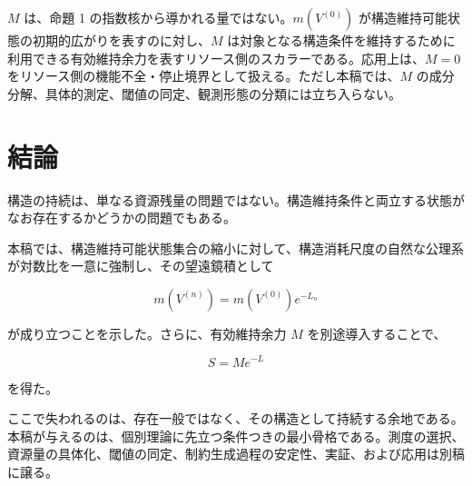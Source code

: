 \documentclass[12pt,a4paper]{article}
\begin{document}
\(M\) は、命題 1 の指数核から導かれる量ではない。\(m(V^{(0)})\) が構造維持可能状態の初期的広がりを表すのに対し、\(M\) は対象となる構造条件を維持するために利用できる有効維持余力を表すリソース側のスカラーである。応用上は、\(M=0\) をリソース側の機能不全・停止境界として扱える。ただし本稿では、\(M\) の成分分解、具体的測定、閾値の同定、観測形態の分類には立ち入らない。

\section{結論}\label{ux7d50ux8ad6}

構造の持続は、単なる資源残量の問題ではない。構造維持条件と両立する状態がなお存在するかどうかの問題でもある。

本稿では、構造維持可能状態集合の縮小に対して、構造消耗尺度の自然な公理系が対数比を一意に強制し、その望遠鏡積として

\[
m(V^{(n)}) = m(V^{(0)}) e^{-L_{n}}
\]

が成り立つことを示した。さらに、有効維持余力 \(M\) を別途導入することで、

\[
S = M e^{-L}
\]

を得た。

ここで失われるのは、存在一般ではなく、その構造として持続する余地である。本稿が与えるのは、個別理論に先立つ条件つきの最小骨格である。測度の選択、資源量の具体化、閾値の同定、制約生成過程の安定性、実証、および応用は別稿に譲る。
\end{document}

